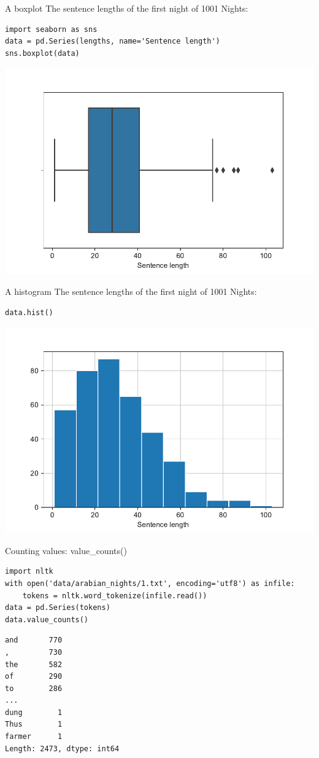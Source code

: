 \documentclass[aspectratio=169,usenames,dvipsnames]{beamer}
\begin{document}
\begin{frame}[fragile]{A boxplot}
The sentence lengths of the first night of 1001 Nights:
\begin{lstlisting}
import seaborn as sns
data = pd.Series(lengths, name='Sentence length')
sns.boxplot(data)
\end{lstlisting}
\includegraphics[height=0.65\textheight]{fig/boxplotsents}
\end{frame}

\begin{frame}[fragile]{A histogram}
The sentence lengths of the first night of 1001 Nights:
\begin{lstlisting}
data.hist()
\end{lstlisting}
\includegraphics[height=0.7\textheight]{fig/basichist}
\end{frame}


\begin{frame}[fragile]{Counting values: value\_counts()}
\begin{lstlisting}
import nltk
with open('data/arabian_nights/1.txt', encoding='utf8') as infile:
    tokens = nltk.word_tokenize(infile.read())
data = pd.Series(tokens)
data.value_counts()
\end{lstlisting}
\begin{lstlisting}[style=plain]
and       770
,         730
the       582
of        290
to        286
... 
dung        1
Thus        1
farmer      1
Length: 2473, dtype: int64
\end{lstlisting}
\end{frame}
\end{document}
